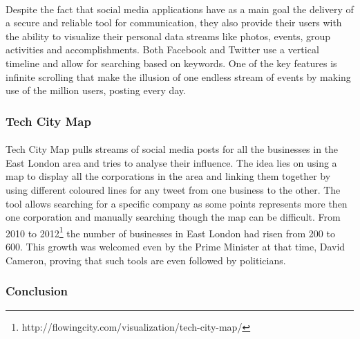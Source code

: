 \documentclass{l4proj}
\begin{document}
\paragraph{}
Despite the fact that social media applications have as a main goal the delivery of a secure and reliable tool for communication, they also provide their users with the ability to visualize their personal data streams like photos, events, group activities and accomplishments. Both Facebook and Twitter use a vertical timeline and allow for searching based on keywords. One of the key features is infinite scrolling that make the illusion of one endless stream of events by making use of the million users, posting every day. 

\subsubsection{Tech City Map}
\paragraph{}
Tech City Map pulls streams of social media posts for all the businesses in the East London area and tries to analyse their influence. The idea lies on using a map to display all the corporations in the area and linking them together by using different coloured lines for any tweet from one business to the other. The tool allows searching for a specific company as some points represents more then one corporation and manually searching though the map can be difficult. From 2010 to 2012\footnote{http://flowingcity.com/visualization/tech-city-map/} the number of businesses in East London had risen from 200 to 600. This growth was welcomed even by the Prime Minister at that time, David Cameron, proving that such tools are even followed by politicians. 

\subsubsection{Conclusion}
\label{subsubsec:conclusion}
\end{document}
